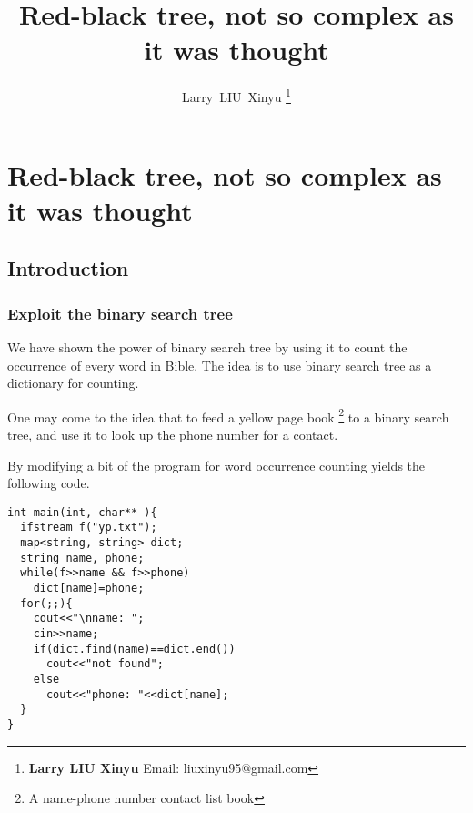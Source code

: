 \documentclass{article}
\begin{document}


\title{Red-black tree, not so complex as it was thought}

\author{Larry~LIU~Xinyu
\thanks{{\bfseries Larry LIU Xinyu } \newline
  Email: liuxinyu95@gmail.com \newline}
  }

\maketitle
\fi


\ifx\wholebook\relax
\chapter{Red-black tree, not so complex as it was thought}
\fi

\section{Introduction}
\label{introduction} 

\subsection{Exploit the binary search tree}
We have shown the power of binary search tree by using it to count
the occurrence of every word in Bible. The idea is to use binary
search tree as a dictionary for counting.

One may come to the idea that to feed a yellow page book
\footnote{A name-phone number contact list book} to a binary
search tree, and use it to look up the phone number for a contact.

By modifying a bit of the program for word occurrence counting
yields the following code.

\begin{lstlisting}
int main(int, char** ){
  ifstream f("yp.txt");
  map<string, string> dict;
  string name, phone;
  while(f>>name && f>>phone)
    dict[name]=phone;
  for(;;){
    cout<<"\nname: ";
    cin>>name;
    if(dict.find(name)==dict.end())
      cout<<"not found";
    else
      cout<<"phone: "<<dict[name];
  }
}
\end{lstlisting}
\end{document}
